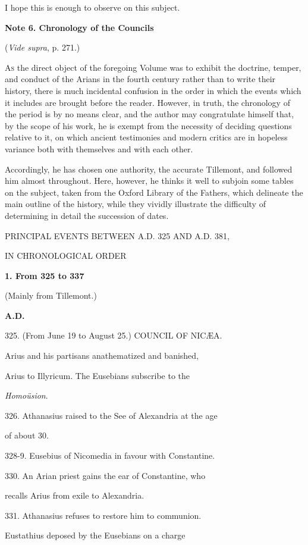 I hope this is enough to observe on this subject.

\textbf{Note 6. Chronology of the Councils}

(\emph{Vide supra}, p. 271.)

A\textsc{s} the direct object of the foregoing Volume was to exhibit
the doctrine, temper, and conduct of the Arians in the fourth century
rather than to write their history, there is much incidental confusion
in the order in which the events which it includes are brought before
the reader. However, in truth, the chronology of the period is by no
means clear, and the author may congratulate himself that, by the
scope of his work, he is exempt from the necessity of deciding
questions relative to it, on which ancient testimonies and modern
critics are in hopeless variance both with themselves and with each
other.

Accordingly, he has chosen one authority, the accurate Tillemont,
and followed him almost throughout. Here, however, he thinks it well
to subjoin some tables on the subject, taken from the Oxford Library
of the Fathers, which delineate the main outline of the history, while
they vividly illustrate the difficulty of determining in detail the
succession of dates.

PRINCIPAL EVENTS
BETWEEN A.D. 325 AND
A.D. 381,

IN CHRONOLOGICAL ORDER

\textbf{1. From 325 to 337}

(Mainly from Tillemont.)

\textbf{A.D.}

325.
(From June 19 to August 25.) COUNCIL
OF NICÆA.

Arius and his partisans anathematized and banished, 

Arius to Illyricum. The Eusebians subscribe to the

\emph{Homoüsion}.

326.
Athanasius raised to the See of Alexandria at
the age

of about 30.

328-9.
Eusebius of Nicomedia in favour with
Constantine.

330.
An Arian priest gains the ear of Constantine,
who

recalls Arius from exile to Alexandria.

331.
Athanasius refuses to restore him to communion.

Eustathius deposed by the Eusebians on a charge

